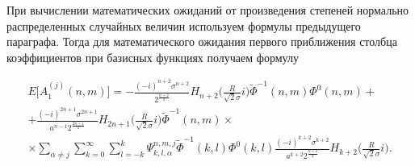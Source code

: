 %
%

При вычислении математических ожиданий от произведения степеней нормально распределенных случайных величин используем формулы предыдущего параграфа. Тогда для математического ожидания первого приближения столбца коэффициентов при базисных функциях получаем формулу

\begin{multline}
E\bigg[A_1^{(j)}(n,m)\bigg]=-\frac{(-i)^{n+2}\sigma^{n+2}}{2^\frac{n+2}{2}}H_{n+2}\bigg(\frac{R}{\sqrt{2}\sigma}i\bigg) \tilde \Phi^{-1}(n,m)\Phi^0(n,m)+ \\
+\frac{(-i)^{2n+1}\sigma^{2n+1}}{a^{n-1} 2^\frac{2n+1}{2}}H_{2n+1}\bigg(\frac{R}{\sqrt{2}\sigma}i\bigg)
\tilde \Phi^{-1}(n,m)\times \\
\times\sum_{\alpha\neq j}\sum_{k=0}^\infty\sum_{l=-k}^k \Psi_{k,l,\alpha}^{n,m,j}\tilde \Phi^{-1}(k,l)\Phi^0(k,l)
\frac{(-i)^{k+2}\sigma^{k+2}}{a^{k+2} 2^\frac{k+2}{2}}H_{k+2}\bigg(\frac{R}{\sqrt{2}\sigma}i\bigg).
\label{eq:13:102}
\end{multline}

